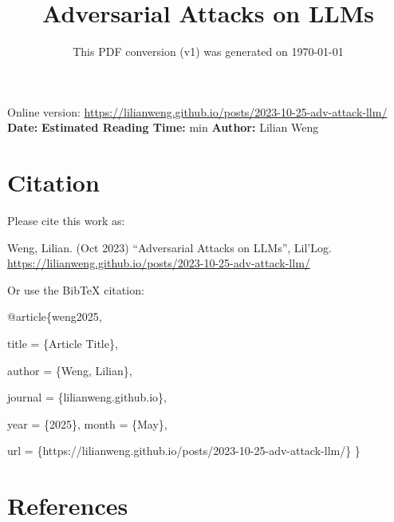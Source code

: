 \documentclass[12pt]{article}
\title{Adversarial Attacks on LLMs}
\date{This PDF conversion (v1) was generated on \today\footnotemark}
\begin{document}
\maketitle
\begin{center}
    Online version: \url{https://lilianweng.github.io/posts/2023-10-25-adv-attack-llm/} \\
    \textbf{Date:} \quad
    \textbf{Estimated Reading Time:}  min \quad
    \textbf{Author:} Lilian Weng
\end{center}




\newpage
\tableofcontents
\newpage
\vspace{1em}
\n\n\n\section{Citation}
Please cite this work as:

\begin{tcolorbox}[colback=black!5!white, colframe=black!80!white, boxrule=0.5pt, arc=2mm, left=1mm, right=1mm, top=1mm, bottom=1mm]
  Weng, Lilian. (Oct 2023) ``Adversarial Attacks on LLMs'', Lil'Log. \url{https://lilianweng.github.io/posts/2023-10-25-adv-attack-llm/}
  \end{tcolorbox}

Or use the BibTeX citation:

\begin{tcolorbox}[
    colback=black!5!white,
    colframe=black!80!white,
    boxrule=0.5pt,
    arc=2mm,
    left=1mm,
    right=1mm,
    top=1mm,
    bottom=1mm,
    listing only,
    listing options={
      basicstyle=\ttfamily\footnotesize,
      breaklines=true,
      literate={\{}{{\char`\{}}1 {\}}{{\char`\}}}1
    }
  ]
  @article\{weng2025,

    title   = \{Article Title\},

    author  = \{Weng, Lilian\},

    journal = \{lilianweng.github.io\},

    year    = \{2025\},
    month   = \{May\},

    url     = \{https://lilianweng.github.io/posts/2023-10-25-adv-attack-llm/\}\n
  \}
  \end{tcolorbox}

\newpage
\section{References}

\n
\end{document}
